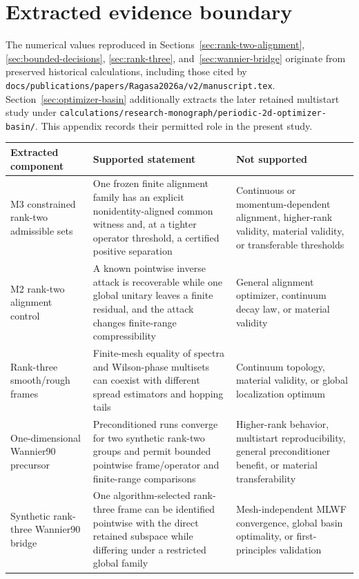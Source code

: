 \section{Extracted evidence boundary}\label{app:evidence-boundary}
The numerical values reproduced in Sections~\ref{sec:rank-two-alignment},
\ref{sec:bounded-decisions}, \ref{sec:rank-three}, and~\ref{sec:wannier-bridge}
originate from preserved historical calculations, including those cited by
\texttt{docs/publications/papers/Ragasa2026a/v2/manuscript.tex}.
Section~\ref{sec:optimizer-basin} additionally extracts the later retained multistart
study under
\texttt{calculations/research-monograph/periodic-2d-optimizer-basin/}. This appendix
records their permitted role in the present study.

\begin{center}\small
\begin{tabularx}{\textwidth}{YYY}
\toprule
\textbf{Extracted component} & \textbf{Supported statement} & \textbf{Not supported} \\
\midrule
M3 constrained rank-two admissible sets & One frozen finite alignment family has an explicit nonidentity-aligned common witness and, at a tighter operator threshold, a certified positive separation & Continuous or momentum-dependent alignment, higher-rank validity, material validity, or transferable thresholds \\
M2 rank-two alignment control & A known pointwise inverse attack is recoverable while one global unitary leaves a finite residual, and the attack changes finite-range compressibility & General alignment optimizer, continuum decay law, or material validity \\
Rank-three smooth/rough frames & Finite-mesh equality of spectra and Wilson-phase multisets can coexist with different spread estimators and hopping tails & Continuum topology, material validity, or global localization optimum \\
One-dimensional Wannier90 precursor & Preconditioned runs converge for two synthetic rank-two groups and permit bounded pointwise frame/operator and finite-range comparisons & Higher-rank behavior, multistart reproducibility, general preconditioner benefit, or material transferability \\
Synthetic rank-three Wannier90 bridge & One algorithm-selected rank-three frame can be identified pointwise with the direct retained subspace while differing under a restricted global family & Mesh-independent MLWF convergence, global basin optimality, or first-principles validation \\

\end{tabularx}
\end{center}
